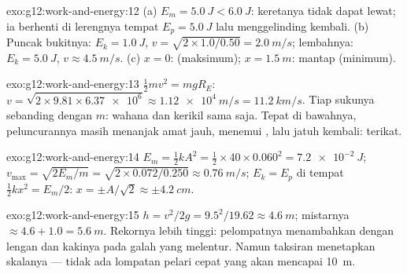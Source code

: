 \begin{solution}{exo:g12:work-and-energy:12}
(a) $E_m = \qty{5.0}{J} < \qty{6.0}{J}$: keretanya tidak dapat lewat; ia berhenti di
lerengnya tempat $E_p = \qty{5.0}{J}$ lalu menggelinding kembali. (b) Puncak bukitnya:
$E_k = \qty{1.0}{J}$, $v = \sqrt{2 \times 1.0/0.50} = \qty{2.0}{m/s}$;
lembahnya: $E_k = \qty{5.0}{J}$, $v \approx \qty{4.5}{m/s}$. (c) $x = 0$:
 (maksimum); $x = \qty{1.5}{m}$: mantap (minimum).
\end{solution}

\begin{solution}{exo:g12:work-and-energy:13}
$\tfrac12 mv^2 = mgR_E$:
$v = \sqrt{2 \times 9.81 \times \num{6.37e6}} \approx \qty{1.12e4}{m/s}
= \qty{11.2}{km/s}$. Tiap sukunya sebanding dengan $m$: wahana dan
kerikil sama saja. Tepat di bawahnya, peluncurannya masih menanjak amat jauh,
menemui , lalu jatuh kembali: terikat.
\end{solution}

\begin{solution}{exo:g12:work-and-energy:14}
$E_m = \tfrac12 kA^2 = \tfrac12 \times 40 \times 0.060^2 =
\qty{7.2e-2}{J}$; $v_{\max} = \sqrt{2E_m/m} =
\sqrt{2 \times 0.072/0.250} \approx \qty{0.76}{m/s}$;
$E_k = E_p$ di tempat $\tfrac12 kx^2 = E_m/2$: $x = \pm A/\sqrt 2 \approx
\pm\qty{4.2}{cm}$.
\end{solution}

\begin{solution}{exo:g12:work-and-energy:15}
$h = v^2/2g = 9.5^2/19.62 \approx \qty{4.6}{m}$; mistarnya $\approx
4.6 + 1.0 = \qty{5.6}{m}$. Rekornya lebih tinggi: pelompatnya menambahkan 
dengan lengan dan kakinya pada galah yang melentur. Namun taksiran 
menetapkan skalanya --- tidak ada lompatan pelari cepat yang akan mencapai \qty{10}{m}.
\end{solution}

